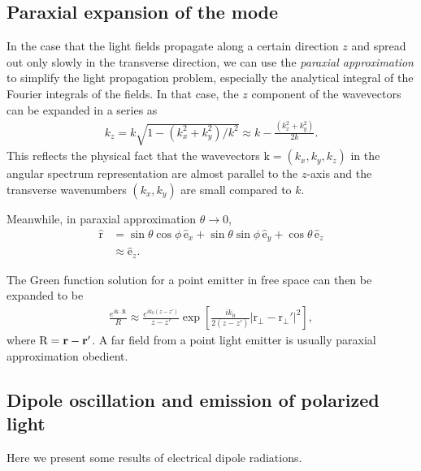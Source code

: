 \subsection{Paraxial expansion of the mode}
In the case that the light fields propagate along a certain direction $ z $ and spread out only slowly in the transverse direction, we can use the \textit{paraxial approximation} to simplify the light propagation problem, especially the analytical integral of the Fourier integrals of the fields. In that case, the $ z $ component of the wavevectors can be expanded in a series as
\begin{align}
k_z=k\sqrt{1-(k^2_x+k^2_y)/k^2}\approx k-\frac{(k^2_x+k^2_y)}{2k}.
\end{align}
This reflects the physical fact that the wavevectors $ \mathrm{k}=(k_x,k_y,k_z) $ in the angular spectrum representation are almost parallel to the $ z $-axis and the transverse wavenumbers $ (k_x,k_y) $ are small compared to $ k $. 

Meanwhile, in paraxial approximation $ \theta\rightarrow 0 $,
\begin{align}
\hat{\mathrm{r}} &= \sin\theta\cos\phi \, \hat{\mathrm{e}}_x + \sin\theta \sin\phi\, \hat{\mathrm{e}}_y + \cos\theta \, \hat{\mathrm{e}}_z\\
&\approx \hat{\mathrm{e}}_z.
\end{align}

The Green function solution for a point emitter in free space can then be expanded to be
\begin{align}
\frac{e^{i\mathrm{k}\cdot \mathrm{R}}}{R}\approx \frac{e^{ik_0(z-z')}}{z-z'}\exp\left[ \frac{ik_0}{2(z-z')} \left| \mathrm{r}_\perp - \mathrm{r}_\perp'\right|^2 \right],
\end{align}
where $ \mathrm{R}=\mathbf{r}-\mathbf{r}' $. 
A far field from a point light emitter is usually paraxial approximation obedient. 







\subsection{Dipole oscillation and emission of polarized light}
Here we present some results of electrical dipole radiations.


